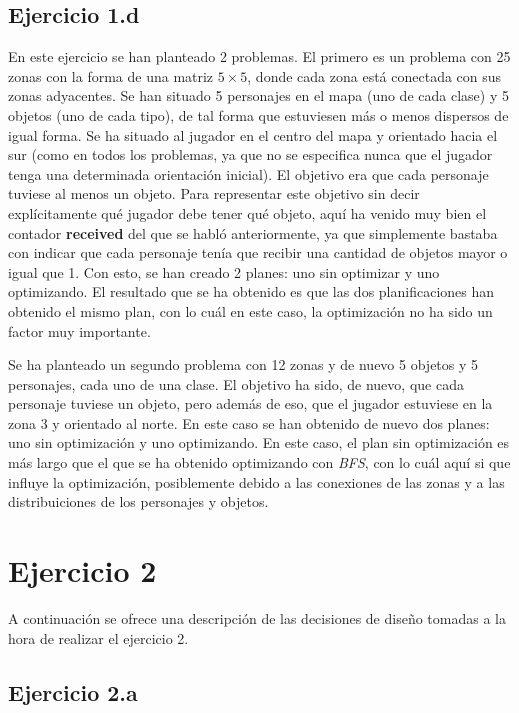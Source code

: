 \documentclass[11pt,a4paper]{article}
\begin{document}
\subsection{Ejercicio 1.d}

En este ejercicio se han planteado 2 problemas. El primero es un problema con 25 zonas con la forma de una matriz $5 \times 5$, donde
cada zona está conectada con sus zonas adyacentes. Se han situado 5 personajes en el mapa (uno de cada clase) y 5 objetos (uno de cada
tipo), de tal forma que estuviesen más o menos dispersos de igual forma. Se ha situado al jugador en el centro del mapa y orientado
hacia el sur (como en todos los problemas, ya que no se especifica nunca que el jugador tenga una determinada orientación inicial).
El objetivo era que cada personaje tuviese al menos un objeto. Para representar este objetivo sin decir explícitamente qué jugador
debe tener qué objeto, aquí ha venido muy bien el contador \textbf{received} del que se habló anteriormente, ya que simplemente
bastaba con indicar que cada personaje tenía que recibir una cantidad de objetos mayor o igual que 1. Con esto, se han creado 2
planes: uno sin optimizar y uno optimizando. El resultado que se ha obtenido es que las dos planificaciones han obtenido el mismo
plan, con lo cuál en este caso, la optimización no ha sido un factor muy importante.

Se ha planteado un segundo problema con 12 zonas y de nuevo 5 objetos y 5 personajes, cada uno de una clase. El objetivo ha sido, de
nuevo, que cada personaje tuviese un objeto, pero además de eso, que el jugador estuviese en la zona 3 y orientado al norte. En este
caso se han obtenido de nuevo dos planes: uno sin optimización y uno optimizando. En este caso, el plan sin optimización es más largo
que el que se ha obtenido optimizando con \textit{BFS}, con lo cuál aquí si que influye la optimización, posiblemente debido a las
conexiones de las zonas y a las distribuiciones de los personajes y objetos.

\section{Ejercicio 2}

A continuación se ofrece una descripción de las decisiones de diseño tomadas a la hora de realizar el ejercicio 2.

\subsection{Ejercicio 2.a}
\end{document}
